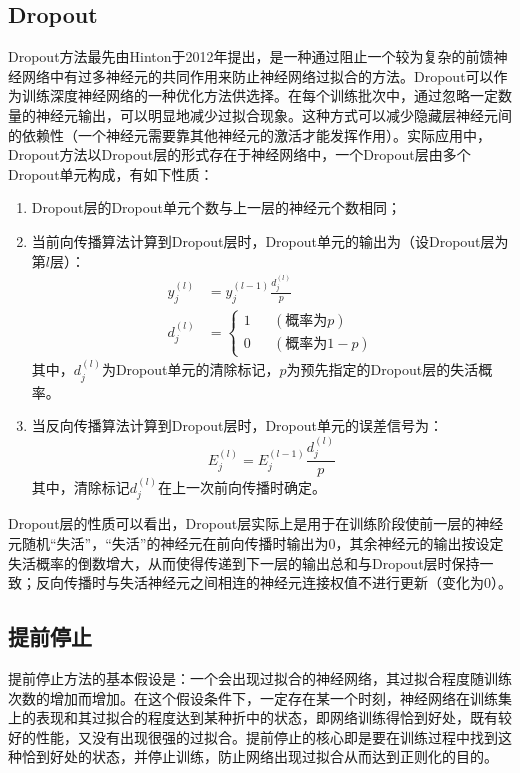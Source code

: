 \documentclass[a4paper]{ctexart}
\begin{document}
\begin{spacing}{1.3}
	\subsection{Dropout}
	Dropout方法最先由Hinton于2012年提出，是一种通过阻止一个较为复杂的前馈神经网络中有过多神经元的共同作用来防止神经网络过拟合的方法\cite{RN133}。Dropout可以作为训练深度神经网络的一种优化方法供选择。在每个训练批次中，通过忽略一定数量的神经元输出，可以明显地减少过拟合现象。这种方式可以减少隐藏层神经元间的依赖性（一个神经元需要靠其他神经元的激活才能发挥作用）。实际应用中，Dropout方法以Dropout层的形式存在于神经网络中，一个Dropout层由多个Dropout单元构成，有如下性质\cite{JMLR:v15:srivastava14a}：
	\begin{enumerate}[itemindent=2em,label=(\arabic*)]
		\item Dropout层的Dropout单元个数与上一层的神经元个数相同；
		\item 当前向传播算法计算到Dropout层时，Dropout单元的输出为（设Dropout层为第$l$层）：
		\begin{equation}
			\begin{split}
				y_j^{(l)}&=y_j^{(l-1)}\frac{d_j^{(l)}}{p}\\
				d_j^{(l)}&=\left\{
					\begin{aligned}
						1&&(\mbox{概率为}p)\\
						0&&(\mbox{概率为}1-p)
					\end{aligned}
					\right.
			\end{split}
		\end{equation}
		其中，$d_j^{(l)}$为Dropout单元的清除标记，$p$为预先指定的Dropout层的失活概率。
		\item 当反向传播算法计算到Dropout层时，Dropout单元的误差信号为：
		\begin{equation}
			E_j^{(l)}=E_j^{(l-1)}\frac{d_j^{(l)}}{p}
		\end{equation}
		其中，清除标记$d_j^{(l)}$在上一次前向传播时确定。
	\end{enumerate}
	Dropout层的性质可以看出，Dropout层实际上是用于在训练阶段使前一层的神经元随机“失活”，“失活”的神经元在前向传播时输出为0，其余神经元的输出按设定失活概率的倒数增大，从而使得传递到下一层的输出总和与Dropout层时保持一致；反向传播时与失活神经元之间相连的神经元连接权值不进行更新（变化为0）。

	\subsection{提前停止}
	提前停止方法的基本假设是：一个会出现过拟合的神经网络，其过拟合程度随训练次数的增加而增加\cite{RN134}。在这个假设条件下，一定存在某一个时刻，神经网络在训练集上的表现和其过拟合的程度达到某种折中的状态，即网络训练得恰到好处，既有较好的性能，又没有出现很强的过拟合。提前停止的核心即是要在训练过程中找到这种恰到好处的状态，并停止训练，防止网络出现过拟合从而达到正则化的目的。


\end{spacing}
\end{document}
